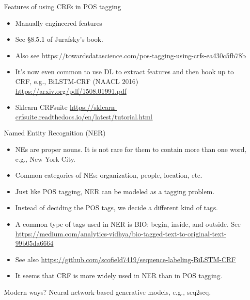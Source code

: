 \documentclass[11pt]{beamer}
\begin{document}
\begin{frame}{Features of using CRFs in POS tagging}
  \begin{itemize}[<+->]
    \item Manually engineered features 
    \item See \S 8.5.1 of Jurafsky's book. 
    \item Also see  \url{https://towardsdatascience.com/pos-tagging-using-crfs-ea430c5fb78b} 
    \item It's now even common to use DL to extract features and then hook up to CRF, e.g., BiLSTM-CRF (NAACL 2016) \url{https://arxiv.org/pdf/1508.01991.pdf}
    \item Sklearn-CRFsuite \url{https://sklearn-crfsuite.readthedocs.io/en/latest/tutorial.html}
  \end{itemize}  
\end{frame}

\begin{frame}{Named Entity Recognition (NER)}
  \begin{itemize}[<+->]
    \item  NEs are proper nouns. It is not rare for them to contain more than one word, e.g., New York City. 
    \item Common categories of NEs: organization, people, location, etc. 
    \item Just like POS tagging, NER can be modeled as a tagging problem. 
    \item Instead of deciding the POS tags, we decide a different kind of tags. 
    \item A common type of tags used in NER is BIO: begin, inside, and outside.  See \url{https://medium.com/analytics-vidhya/bio-tagged-text-to-original-text-99b05da6664}
    \item See also \url{https://github.com/scofield7419/sequence-labeling-BiLSTM-CRF}
    \item It seems that CRF is more widely used in NER than in POS tagging. 
  \end{itemize}
\end{frame}

\begin{frame}{Modern ways? }
   Neural network-based generative models, e.g., seq2seq. 
\end{frame}

\end{document}
